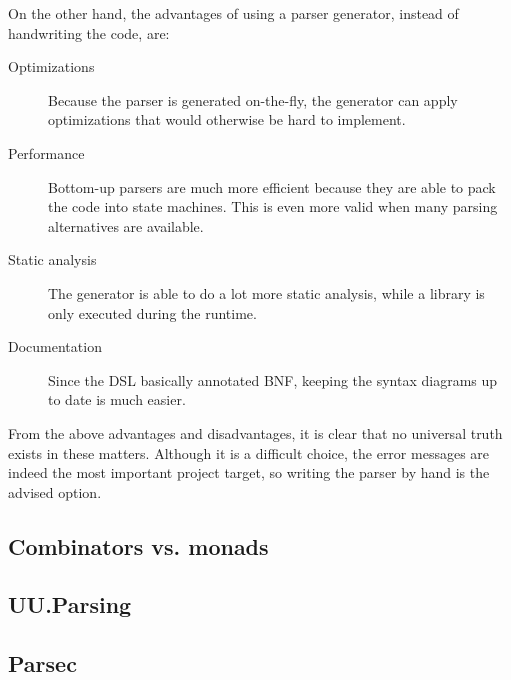 \noindent
On the other hand, the advantages of using a parser generator, instead of handwriting the code, are:
\begin{description}
	\item[Optimizations] Because the parser is generated on-the-fly, the generator can apply optimizations that would otherwise be hard to implement.
	\item[Performance] Bottom-up parsers are much more efficient because they are able to pack the code into state machines.
		This is even more valid when many parsing alternatives are available.
	\item[Static analysis] The generator is able to do a lot more static analysis, while a library is only executed during the runtime.
	\item[Documentation] Since the DSL basically annotated BNF, keeping the syntax diagrams up to date is much easier.
\end{description}

\noindent
From the above advantages and disadvantages, it is clear that no universal truth exists in these matters.
Although it is a difficult choice, the error messages are indeed the most important project target, so writing the parser by hand is the advised option.

\subsection{Combinators vs. monads}

\subsection{UU.Parsing}
%


\subsection{Parsec}
%



